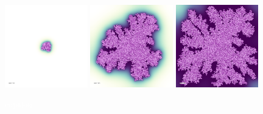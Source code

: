 \documentclass{article}
\newcommand{\todo}[1]{\colorbox{WildStrawberry}{\textcolor{white}{#1}}}
\begin{document}
\begin{figure}[H]
    \centering
    \includegraphics[width=0.32\textwidth]{figures/crb_sim_branching/cells_at_iter_0000000200.png}%
    \hspace{0.01\textwidth}%
    \includegraphics[width=0.32\textwidth]{figures/crb_sim_branching/cells_at_iter_0000003400.png}%
    \hspace{0.01\textwidth}%
    \includegraphics[width=0.32\textwidth]{figures/crb_sim_branching/cells_at_iter_0000006600.png}%
    \caption{\todo{caption}}
    \label{fig:bacterial-branching-sim}
\end{figure}
\end{document}
